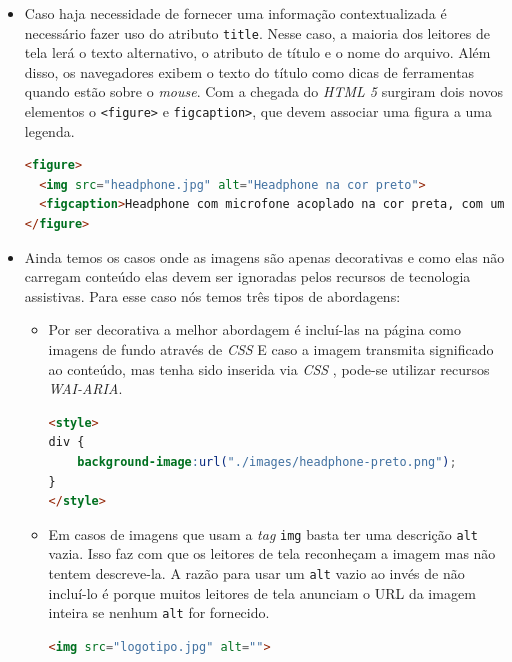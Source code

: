 {\begin{itemize}
\vspace{1.5cm}
{\centerline{\textbf{Caso de uso 2}: Adaptação e construção de imagens acessíveis.} 
As imagens que possuem algum tipo de conteúdo devem ser acessíveis, elas precisam de alguma descrição, seja ela visível ou não. Existe o atributo \lstinline{alt} para a \textit{tag} \lstinline{img}, onde ele serve para descrever o que está presente na imagem. Essa descrição do \lstinline{alt} não aparece visualmente, mas ela é lida pelo leitor de tela, quando o usuário, navegando pelo teclado, passar pela imagem.}
{\begin{lstlisting}[language=html,caption=usando atributo \lstinline{alt}]
<img src="headphone.jpg" alt="Headphone na cor preto"> 
\end{lstlisting}}
\item Caso haja necessidade de fornecer uma informação contextualizada é necessário fazer uso do atributo \lstinline{title}. Nesse caso, a maioria dos leitores de tela lerá o texto alternativo, o atributo de título e o nome do arquivo. Além disso, os navegadores exibem o texto do título como dicas de ferramentas quando estão sobre o \textit{mouse}. Com a chegada do \textit{HTML 5} \cite{HTML} surgiram dois novos elementos o \lstinline{<figure>} e \lstinline{figcaption>}, que devem associar uma figura a uma legenda. 
{\begin{lstlisting}[language=html,caption=usando atributo alt]
<figure>
  <img src="headphone.jpg" alt="Headphone na cor preto"> 
  <figcaption>Headphone com microfone acoplado na cor preta, com um fio de ótima construção</figcaption>
</figure>
\end{lstlisting}}

\item  Ainda temos os casos onde as imagens são apenas decorativas e como elas não carregam conteúdo elas devem ser ignoradas pelos recursos de tecnologia assistivas. Para esse caso nós temos três tipos de abordagens: 
\begin{itemize}
\item Por ser decorativa a melhor abordagem é incluí-las na página como imagens de fundo através de \textit{CSS} \cite{CSS} E caso a imagem transmita significado ao conteúdo, mas tenha sido inserida via \textit{CSS} \cite{CSS}, pode-se utilizar recursos \textit{WAI-ARIA}\cite{WAI-ARIA}.
{\begin{lstlisting}[language=html,caption=adicionando imagem via CSS]
<style>
div {
    background-image:url("./images/headphone-preto.png");
}
</style>
\end{lstlisting}}
\item Em casos de imagens que usam a \textit{tag} \lstinline{img} basta ter uma descrição \lstinline{alt} vazia. Isso faz com que os leitores de tela reconheçam a imagem mas não tentem descreve-la. A razão para usar um \lstinline{alt} vazio ao invés de não incluí-lo é porque muitos leitores de tela anunciam o URL da imagem inteira se nenhum \lstinline{alt} for fornecido.
{\begin{lstlisting}[language=html,caption=usando atributo \lstinline{alt} vazio]
<img src="logotipo.jpg" alt=""> 
\end{lstlisting}}


\end{itemize}
\end{itemize}}
